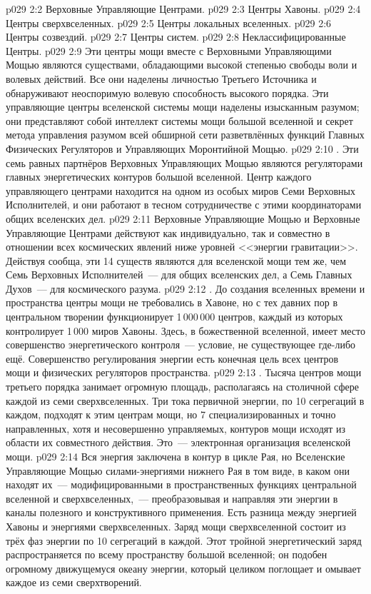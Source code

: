 \vs p029 2:2 Верховные Управляющие Центрами.
\vs p029 2:3 Центры Хавоны.
\vs p029 2:4 Центры сверхвселенных.
\vs p029 2:5 Центры локальных вселенных.
\vs p029 2:6 Центры созвездий.
\vs p029 2:7 Центры систем.
\vs p029 2:8 Неклассифицированные Центры.
\vs p029 2:9 \pc Эти центры мощи вместе с Верховными Управляющими Мощью являются существами, обладающими высокой степенью свободы воли и волевых действий. Все они наделены личностью Третьего Источника и обнаруживают неоспоримую волевую способность высокого порядка. Эти управляющие центры вселенской системы мощи наделены изысканным разумом; они представляют собой интеллект системы мощи большой вселенной и секрет метода управления разумом всей обширной сети разветвлённых функций Главных Физических Регуляторов и Управляющих Моронтийной Мощью.
\vs p029 2:10 . Эти семь равных партнёров Верховных Управляющих Мощью являются регуляторами главных энергетических контуров большой вселенной. Центр каждого управляющего центрами находится на одном из особых миров Семи Верховных Исполнителей, и они работают в тесном сотрудничестве с этими координаторами общих вселенских дел.
\vs p029 2:11 Верховные Управляющие Мощью и Верховные Управляющие Центрами действуют как индивидуально, так и совместно в отношении всех космических явлений ниже уровней <<энергии гравитации>>. Действуя сообща, эти 14 существ являются для вселенской мощи тем же, чем Семь Верховных Исполнителей~--- для общих вселенских дел, а Семь Главных Духов~--- для космического разума.
\vs p029 2:12 . До создания вселенных времени и пространства центры мощи не требовались в Хавоне, но с тех давних пор в центральном творении функционирует 1\,000\,000 центров, каждый из которых контролирует 1\,000 миров Хавоны. Здесь, в божественной вселенной, имеет место совершенство энергетического контроля~--- условие, не существующее где\hyp{}либо ещё. Совершенство регулирования энергии есть конечная цель всех центров мощи и физических регуляторов пространства.
\vs p029 2:13 . Тысяча центров мощи третьего порядка занимает огромную площадь, располагаясь на столичной сфере каждой из семи сверхвселенных. Три тока первичной энергии, по 10 сегрегаций в каждом, подходят к этим центрам мощи, но 7 специализированных и точно направленных, хотя и несовершенно управляемых, контуров мощи исходят из области их совместного действия. Это~--- электронная организация вселенской мощи.
\vs p029 2:14 Вся энергия заключена в контур в цикле Рая, но Вселенские Управляющие Мощью  силами\hyp{}энергиями нижнего Рая в том виде, в каком они находят их~--- модифицированными в пространственных функциях центральной вселенной и сверхвселенных,~--- преобразовывая и направляя эти энергии в каналы полезного и конструктивного применения. Есть разница между энергией Хавоны и энергиями сверхвселенных. Заряд мощи сверхвселенной состоит из трёх фаз энергии по 10 сегрегаций в каждой. Этот тройной энергетический заряд распространяется по всему пространству большой вселенной; он подобен огромному движущемуся океану энергии, который целиком поглощает и омывает каждое из семи сверхтворений.
